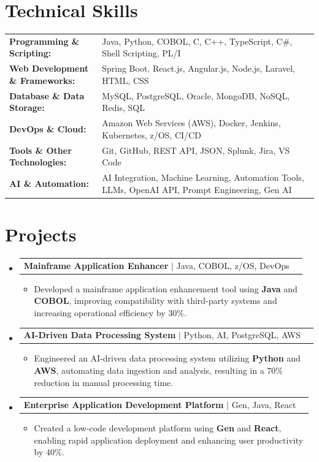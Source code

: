\documentclass[letterpaper,10pt]{article}
\makeatletter
\newcommand{\resumeItem}[1]{
  \item{\fontsize{8pt}{9pt}\selectfont
    #1 \vspace{-3pt}
  }
}
\newcommand{\resumeProjectHeading}[2]{
    \item
    \begin{tabular*}{1.001\textwidth}{l@{\extracolsep{\fill}}r}
      \fontsize{8.5pt}{10pt}#1 & \textbf{\fontsize{8.5pt}{10pt} #2}\\
    \end{tabular*}\vspace{-7pt}
}
\newcommand{\resumeSubHeadingListStart}{\begin{itemize}[leftmargin=0pt, label={}]}
\newcommand{\resumeSubHeadingListEnd}{\end{itemize}}
\newcommand{\resumeItemListStart}{\begin{itemize}[leftmargin=*]}
\newcommand{\resumeItemListEnd}{\end{itemize}\vspace{-5pt}}
\makeatother
\begin{document}
\section{Technical Skills}
        \vspace{-14pt}
        \begin{table}[h]
            \fontsize{8pt}{9pt}\selectfont
            \begin{tabular}{p{0.3\linewidth} p{0.7\linewidth}}
                \textbf{Programming \& Scripting:} & Java, Python, COBOL, C, C++, TypeScript, C\#, Shell Scripting, PL/I \\
                \textbf{Web Development \& Frameworks:} & Spring Boot, React.js, Angular.js, Node.js, Laravel, HTML, CSS \\
                \textbf{Database \& Data Storage:} & MySQL, PostgreSQL, Oracle, MongoDB, NoSQL, Redis, SQL \\
                \textbf{DevOps \& Cloud:} & Amazon Web Services (AWS), Docker, Jenkins, Kubernetes, z/OS, CI/CD \\
                \textbf{Tools \& Other Technologies:} & Git, GitHub, REST API, JSON, Splunk, Jira, VS Code \\
                \textbf{AI \& Automation:} & AI Integration, Machine Learning, Automation Tools, LLMs, OpenAI API, Prompt Engineering, Gen AI \\
            \end{tabular}
        \end{table}
 \vspace{-18pt}

\section{Projects}
    \vspace{-5pt}
    \resumeSubHeadingListStart
          \resumeProjectHeading
            {\textbf{Mainframe Application Enhancer} $|$ Java, COBOL, z/OS, DevOps}{}
            \resumeItemListStart
                \resumeItem{Developed a mainframe application enhancement tool using \textbf{Java} and \textbf{COBOL}, improving compatibility with third-party systems and increasing operational efficiency by 30\%.}
            \resumeItemListEnd
        \vspace{-12pt}
    
        \resumeProjectHeading
            {\textbf{AI-Driven Data Processing System} $|$ Python, AI, PostgreSQL, AWS}{}
        \resumeItemListStart
                \resumeItem{Engineered an AI-driven data processing system utilizing \textbf{Python} and \textbf{AWS}, automating data ingestion and analysis, resulting in a 70\% reduction in manual processing time.}
        \resumeItemListEnd
      \vspace{-12pt}
      \resumeProjectHeading
        {\textbf{Enterprise Application Development Platform} $|$ Gen, Java, React}{}
    \resumeItemListStart
            \resumeItem{Created a low-code development platform using \textbf{Gen} and \textbf{React}, enabling rapid application deployment and enhancing user productivity by 40\%.}
    \resumeItemListEnd
    \resumeSubHeadingListEnd
\end{document}
